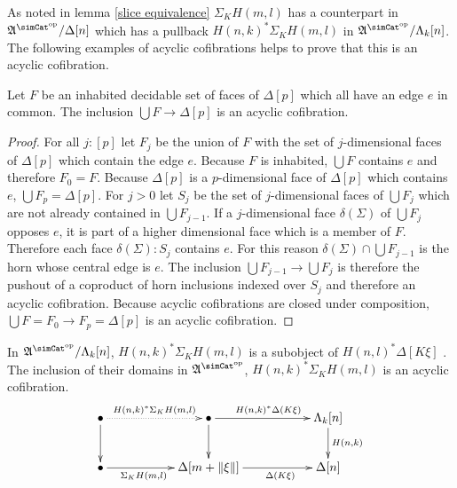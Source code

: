 \documentclass{tac}
\newcommand\ri{^*}
\newcommand\dual{^{\mathrm{op}}}
\newcommand\s{^{\simCat\dual}}
\newcommand\of{:}
\newcommand\simplex\Delta
\newcommand\horn\Lambda
\newcommand\norm[1]{\Vert #1 \Vert}
\newcommand\depsum{\Sigma_}
\newcommand\face\delta
\newcommand\ambient{\mathfrak A}
\begin{document}
As noted in lemma \ref{slice equivalence} $\depsum K H(m,l)$ has a counterpart in $\ambient\s/\simplex[n]$ which has a pullback $H(n,k)\ri \depsum K H(m,l)$ in $\ambient\s/\horn_k[n]$. The following examples of acyclic cofibrations helps to prove that this is an acyclic cofibration.

\begin{lemma} Let $F$ be an inhabited decidable set of faces of $\simplex[p]$ which all have an edge $e$ in common. The inclusion $\bigcup F\to \simplex[p]$ is an acyclic cofibration. \label{face completion} \end{lemma}

\begin{proof} For all $j\of[p]$ let $F_j$ be the union of $F$ with the set of $j$-dimensional faces of $\simplex[p]$ which contain the edge $e$. Because $F$ is inhabited, $\bigcup F$ contains $e$ and therefore $F_0=F$. Because $\simplex[p]$ is a $p$-dimensional face of $\simplex[p]$ which contains $e$, $\bigcup F_p = \simplex[p]$. For $j>0$ let $S_j$ be the set of $j$-dimensional faces of $\bigcup F_j$ which are not already contained in $\bigcup F_{j-1}$. If a $j$-dimensional face $\face(\Sigma)$ of $\bigcup F_j$ opposes $e$, it is part of a higher dimensional face which is a member of $F$. Therefore each face $\face(\Sigma)\of S_j$ contains $e$. For this reason $\face(\Sigma)\cap \bigcup F_{j-1}$ is the horn whose central edge is $e$. The inclusion $\bigcup F_{j-1}\to\bigcup F_j$ is therefore the pushout of a coproduct of horn inclusions indexed over $S_j$ and therefore an acyclic cofibration. Because acyclic cofibrations are closed under composition, $\bigcup F = F_0\to F_p = \simplex[p]$ is an acyclic cofibration. 
\end{proof}

\begin{lemma} In $\ambient\s/\horn_k[n]$, $H(n,k)\ri \depsum K H(m,l)$ is a subobject of $H(n,l)\ri\simplex[K\xi]$ . The inclusion of their domains in $\ambient\s$, $H(n,k)\ri \depsum K H(m,l)$ is an acyclic cofibration. \label{acyclic cofibrancy} 
\[\xymatrix{
\bullet \ar@{.>}[rr]^{H(n,k)\ri \depsum K H(m,l)} \ar[d] && \bullet\ar[rr]^{H(n,k)\ri\simplex(K\xi)}\ar[d] && \horn_k[n]\ar[d]^{H(n,k)}\\
\bullet\ar[rr]_(.4){\depsum K H(m,l)} && \simplex[m+\norm\xi]\ar[rr]_(.6){\simplex(K\xi)} && \simplex[n]
}\]
\end{lemma}
\end{document}
